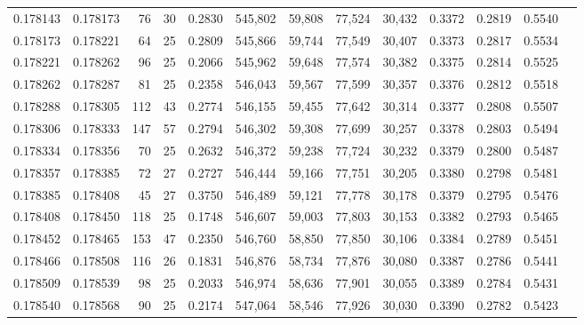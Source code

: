 \begin{tabular}{rrrrrrrrrrrrr}
0.178143 & 0.178173 &  76 &  30 &                                     0.2830 & 545,802 &  59,808 &  77,524 &  30,432 & 0.3372 & 0.2819 & 0.5540 \\
0.178173 & 0.178221 &  64 &  25 &                                     0.2809 & 545,866 &  59,744 &  77,549 &  30,407 & 0.3373 & 0.2817 & 0.5534 \\
0.178221 & 0.178262 &  96 &  25 &                                     0.2066 & 545,962 &  59,648 &  77,574 &  30,382 & 0.3375 & 0.2814 & 0.5525 \\
0.178262 & 0.178287 &  81 &  25 &                                     0.2358 & 546,043 &  59,567 &  77,599 &  30,357 & 0.3376 & 0.2812 & 0.5518 \\
0.178288 & 0.178305 & 112 &  43 &                                     0.2774 & 546,155 &  59,455 &  77,642 &  30,314 & 0.3377 & 0.2808 & 0.5507 \\
0.178306 & 0.178333 & 147 &  57 &                                     0.2794 & 546,302 &  59,308 &  77,699 &  30,257 & 0.3378 & 0.2803 & 0.5494 \\
0.178334 & 0.178356 &  70 &  25 &                                     0.2632 & 546,372 &  59,238 &  77,724 &  30,232 & 0.3379 & 0.2800 & 0.5487 \\
0.178357 & 0.178385 &  72 &  27 &                                     0.2727 & 546,444 &  59,166 &  77,751 &  30,205 & 0.3380 & 0.2798 & 0.5481 \\
0.178385 & 0.178408 &  45 &  27 &                                     0.3750 & 546,489 &  59,121 &  77,778 &  30,178 & 0.3379 & 0.2795 & 0.5476 \\
0.178408 & 0.178450 & 118 &  25 &                                     0.1748 & 546,607 &  59,003 &  77,803 &  30,153 & 0.3382 & 0.2793 & 0.5465 \\
0.178452 & 0.178465 & 153 &  47 &                                     0.2350 & 546,760 &  58,850 &  77,850 &  30,106 & 0.3384 & 0.2789 & 0.5451 \\
0.178466 & 0.178508 & 116 &  26 &                                     0.1831 & 546,876 &  58,734 &  77,876 &  30,080 & 0.3387 & 0.2786 & 0.5441 \\
0.178509 & 0.178539 &  98 &  25 &                                     0.2033 & 546,974 &  58,636 &  77,901 &  30,055 & 0.3389 & 0.2784 & 0.5431 \\
0.178540 & 0.178568 &  90 &  25 &                                     0.2174 & 547,064 &  58,546 &  77,926 &  30,030 & 0.3390 & 0.2782 & 0.5423 \\

\end{tabular}
